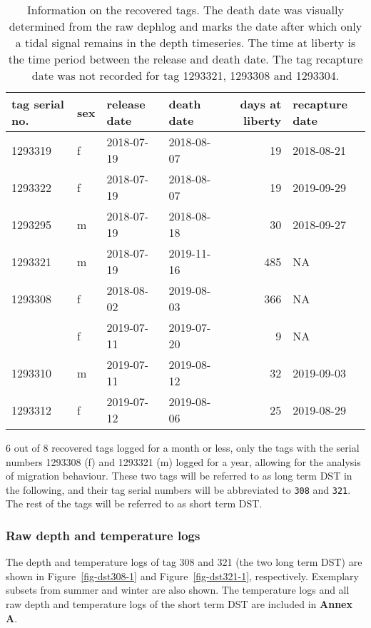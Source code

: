 \documentclass[
  authoryear,
  review,
  3p]{elsarticle}
\begin{document}
\hypertarget{tbl-dstsum}{}
\begin{table}[H]
\caption{\label{tbl-dstsum}Information on the recovered tags. The death date was visually
determined from the raw dephlog and marks the date after which only a
tidal signal remains in the depth timeseries. The time at liberty is the
time period between the release and death date. The tag recapture date
was not recorded for tag 1293321, 1293308 and 1293304. }\tabularnewline

\centering
\begin{tabular}{llllrl}
\toprule
tag serial no. & sex & release date & death date & days at liberty & recapture date\\
\midrule
1293319 & f & 2018-07-19 & 2018-08-07 & 19 & 2018-08-21\\
1293322 & f & 2018-07-19 & 2018-08-07 & 19 & 2019-09-29\\
1293295 & m & 2018-07-19 & 2018-08-18 & 30 & 2018-09-27\\
1293321 & m & 2018-07-19 & 2019-11-16 & 485 & NA\\
1293308 & f & 2018-08-02 & 2019-08-03 & 366 & NA\\
\addlinespace
1293304 & f & 2019-07-11 & 2019-07-20 & 9 & NA\\
1293310 & m & 2019-07-11 & 2019-08-12 & 32 & 2019-09-03\\
1293312 & f & 2019-07-12 & 2019-08-06 & 25 & 2019-08-29\\
\bottomrule
\end{tabular}
\end{table}

6 out of 8 recovered tags logged for a month or less, only the tags with
the serial numbers 1293308 (f) and 1293321 (m) logged for a year,
allowing for the analysis of migration behaviour. These two tags will be
referred to as long term DST in the following, and their tag serial
numbers will be abbreviated to \texttt{308} and \texttt{321}. The rest
of the tags will be referred to as short term DST.

\hypertarget{raw-depth-and-temperature-logs}{%
\subsubsection{Raw depth and temperature
logs}\label{raw-depth-and-temperature-logs}}

The depth and temperature logs of tag 308 and 321 (the two long term
DST) are shown in Figure~\ref{fig-dst308-1} and
Figure~\ref{fig-dst321-1}, respectively. Exemplary subsets from summer
and winter are also shown. The temperature logs and all raw depth and
temperature logs of the short term DST are included in \textbf{Annex A}.
\end{document}
